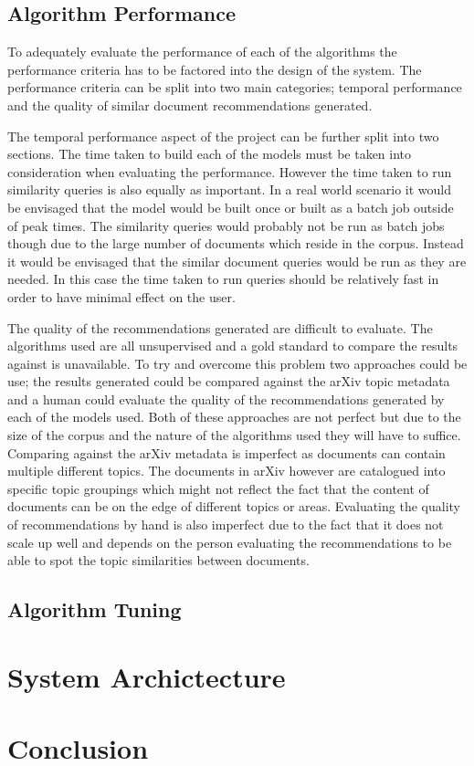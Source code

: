 \subsection{Algorithm Performance}
To adequately evaluate the performance of each of the algorithms the performance criteria has to be factored into the design of the system.
The performance criteria can be split into two main categories; temporal performance and the quality of similar document recommendations generated.

The temporal performance aspect of the project can be further split into two sections.
The time taken to build each of the models must be taken into consideration when evaluating the performance.
However the time taken to run similarity queries is also equally as important.
In a real world scenario it would be envisaged that the model would be built once or built as a batch job outside of peak times.
The similarity queries would probably not be run as batch jobs though due to the large number of documents which reside in the corpus.
Instead it would be envisaged that the similar document queries would be run as they are needed.
In this case the time taken to run queries should be relatively fast in order to have minimal effect on the user.

The quality of the recommendations generated are difficult to evaluate.
The algorithms used are all unsupervised and a gold standard to compare the results against is unavailable.
To try and overcome this problem two approaches could be use; the results generated could be compared against the arXiv topic metadata and a human could evaluate the quality of the recommendations generated by each of the models used.
Both of these approaches are not perfect but due to the size of the corpus and the nature of the algorithms used they will have to suffice.
Comparing against the arXiv metadata is imperfect as documents can contain multiple different topics.
The documents in arXiv however are catalogued into specific topic groupings which might not reflect the fact that the content of documents can be on the edge of different topics or areas.
Evaluating the quality of recommendations by hand is also imperfect due to the fact that it does not scale up well and depends on the person evaluating the recommendations to be able to spot the topic similarities between documents.

\subsection{Algorithm Tuning}

\section{System Archictecture}
\section{Conclusion}
